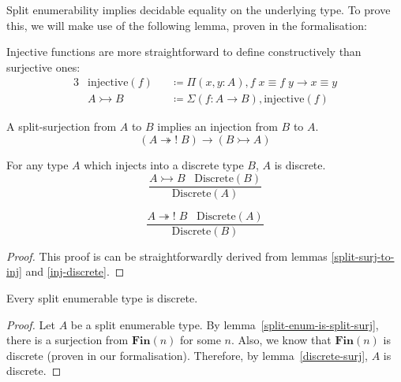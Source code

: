 Split enumerability implies decidable equality on the underlying type.
To prove this, we will make use of the following lemma, proven in the
formalisation:
\begin{definition}[Injections]
  Injective functions are more straightforward to define constructively than
  surjective ones:
  \begin{alignat}{3}
    & \text{injective}(f) &&\coloneqq \Pi (x, y : A) , f \; x \equiv f \; y \rightarrow x \equiv y \\
    & A \rightarrowtail B &&\coloneqq \Sigma(f : A \rightarrow B) , \text{injective}(f)
  \end{alignat}
\end{definition}
\begin{lemma} \label{split-surj-to-inj}
  A split-surjection from \(A\) to \(B\) implies an injection from \(B\) to
  \(A\).
  \begin{equation}
    (A \twoheadrightarrow! \; B) \rightarrow (B \rightarrowtail A)
  \end{equation}
\end{lemma}
\begin{lemma} \label{inj-discrete}
  For any type \(A\) which injects into a discrete type \(B\), \(A\) is
  discrete.
  \begin{equation}
    \frac{
      A \rightarrowtail B \; \; \; \text{Discrete}(B)
    }{
      \text{Discrete}(A)
    }
  \end{equation}
\end{lemma}

\begin{lemma} \label{discrete-surj}
  \begin{equation}
    \frac{
      A \twoheadrightarrow! \; B \; \; \; \text{Discrete}(A)
    }{
      \text{Discrete}(B) 
    }
  \end{equation}
\end{lemma}
\begin{proof}
  This proof is can be straightforwardly derived from lemmas
  \ref{split-surj-to-inj} and \ref{inj-discrete}.
\end{proof}

\begin{lemma} \label{split-enum-discrete}
  Every split enumerable type is discrete.
\end{lemma}
\begin{proof}
  Let \(A\) be a split enumerable type.
  By lemma~\ref{split-enum-is-split-surj}, there is a surjection from
  \(\mathbf{Fin}(n)\) for some \(n\).
  Also, we know that \(\mathbf{Fin}(n)\) is discrete (proven in our
  formalisation).
  Therefore, by lemma~\ref{discrete-surj}, \(A\) is discrete.
\end{proof}

